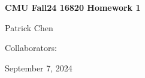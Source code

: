 \documentclass{article}
\begin{document}
	\begin{titlepage}
    	\vspace*{\fill} %
    	\begin{center}
        	{\huge \textbf{CMU Fall24 16820 Homework 1} \par}
       		\vspace{0.5cm}
        		{\large Patrick Chen \par}
        		\vspace{0.5cm}
		{\large Collaborators: \par}
		\vspace{0.5cm}
        		{\large September 7, 2024 \par}
    	\end{center}
    	\vspace*{\fill} %
	\end{titlepage}
	
	\newpage
\end{document}
